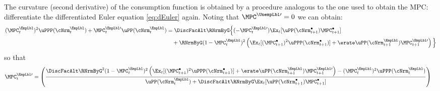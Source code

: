 \documentclass{econark}
\begin{document}
The curvature (second derivative) of the consumption function is obtained by a procedure analogous to the one used to obtain the MPC: differentiate the differentiated Euler equation \eqref{eq:dEuler} again.  Noting that $\MPC^{\UnempLbl\prime}=0$ we can obtain:
\begin{equation}\begin{gathered}\begin{aligned}
(\MPC^{\EmpLbl}_{t})^{2} \uPPP(\cNrm^{\EmpLbl}_{t}) +\MPC_{t}^{\EmpLbl\prime}\uPP(\cNrm^{\EmpLbl}_{t}) & = \DiscFacAlt \RNrmByG \Big\{(-\MPC_{t}^{\EmpLbl\prime}) \Ex_{t}[\uPP(\cNrm^{\bullet}_{t+1})\MPC^{\bullet}_{t+1}]
\\ & \quad +  \RNrmByG (1-\MPC^{\EmpLbl}_{t})^{2}\left(\Ex_{t}[(\MPC_{t+1}^{\bullet})^{2}\uPPP(\cNrm^{\bullet}_{t+1})]+\erate  \uPP(\cNrm^{\EmpLbl}_{t+1})\MPC_{t+1}^{\EmpLbl\prime}\right)\Big\} \label{eq:kappaPExpr}
\end{aligned}\end{gathered}\end{equation}
so that
\begin{equation}\begin{gathered}\begin{aligned}
\MPC^{\EmpLbl\prime}_{t}   & =  \left(\frac{\DiscFacAlt \RNrmByG^{2} (1-\MPC^{\EmpLbl}_{t})^{2} \left( \Ex_{t}[(\MPC_{t+1}^{\bullet})^{2}\uPPP(\cNrm^{\bullet}_{t+1})] +\erate \uPP(\cNrm^{\EmpLbl}_{t+1}) \MPC^{\EmpLbl \prime}_{t+1}\right)-(\MPC^{\EmpLbl}_{t})^{2} \uPPP(\cNrm^{\EmpLbl}_{t})}{\uPP(\cNrm^{\EmpLbl}_{t})+\DiscFacAlt \RNrmByG \Ex_{t}[\uPP(\cNrm^{\bullet}_{t+1})\MPC^{\bullet}_{t+1}]  }\right) \label{eq:kappaPReverse}
\end{aligned}\end{gathered}\end{equation}
\end{document}
